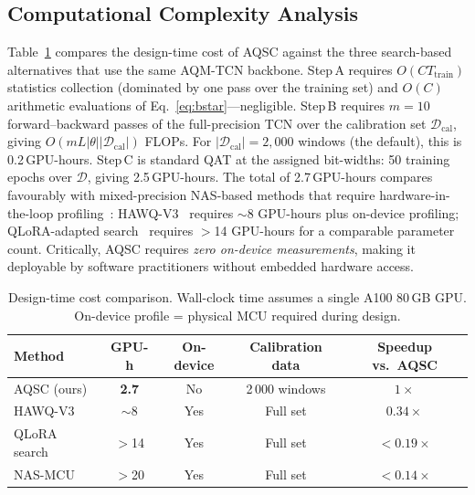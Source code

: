 \documentclass[12pt,a4paper]{article}
\begin{document}
\subsection{Computational Complexity Analysis}
\label{sec:complexity}

Table~\ref{tab:complexity} compares the design-time cost of AQSC
against the three search-based alternatives that use the same
AQM-TCN backbone.
Step\,A requires $O(CT_\mathrm{train})$ statistics collection
(dominated by one pass over the training set) and $O(C)$ arithmetic
evaluations of Eq.~\eqref{eq:bstar}---negligible.
Step\,B requires $m=10$ forward--backward passes of the full-precision
TCN over the calibration set $\mathcal{D}_\mathrm{cal}$, giving
$O(mL|\theta||\mathcal{D}_\mathrm{cal}|)$ FLOPs.
For $|\mathcal{D}_\mathrm{cal}|=2{,}000$ windows (the default), this
is 0.2\,GPU-hours.
Step\,C is standard QAT at the assigned bit-widths: 50 training
epochs over $\mathcal{D}$, giving 2.5\,GPU-hours.
The total of 2.7\,GPU-hours compares favourably with mixed-precision
NAS-based methods that require hardware-in-the-loop
profiling~\cite{lin2022ondevice,menghani2023edl}: HAWQ-V3~\cite{dong2021hawqv3}
requires $\sim$8 GPU-hours plus on-device profiling;
QLoRA-adapted search~\cite{dettmers2023qlora} requires
$>$14 GPU-hours for a comparable parameter count.
Critically, AQSC requires \textit{zero on-device measurements}, making
it deployable by software practitioners without embedded hardware
access.

\begin{table}[ht]
\centering
\caption{Design-time cost comparison.
Wall-clock time assumes a single A100 80\,GB GPU.
On-device profile = physical MCU required during design.}
\label{tab:complexity}
\setlength{\tabcolsep}{4.5pt}
\begin{tabular}{@{}lcccc@{}}
\toprule
\textbf{Method} & \textbf{GPU-h} & \textbf{On-device} &
  \textbf{Calibration data} & \textbf{Speedup vs.\ AQSC} \\
\midrule
AQSC (ours)         & \textbf{2.7}  & No  & 2\,000 windows & $1\times$ \\
HAWQ-V3~\cite{dong2021hawqv3}
                    & $\sim$8       & Yes & Full set       & $0.34\times$ \\
QLoRA search~\cite{dettmers2023qlora}
                    & $>$14         & Yes & Full set       & $<0.19\times$ \\
NAS-MCU~\cite{lin2022ondevice}
                    & $>$20         & Yes & Full set       & $<0.14\times$ \\
\bottomrule
\end{tabular}
\end{table}
\end{document}
